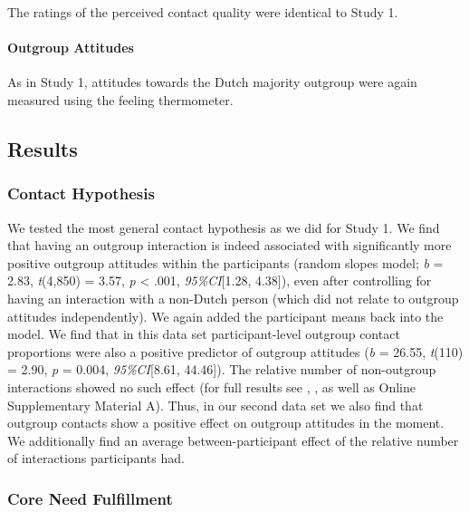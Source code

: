 The ratings of the perceived contact quality were identical to Study 1.

\paragraph{Outgroup Attitudes}

As in Study 1, attitudes towards the Dutch majority outgroup were again
measured using the feeling thermometer.

\subsection{Results}

\subsubsection{Contact Hypothesis}

We tested the most general contact hypothesis as we did for Study 1. We
find that having an outgroup interaction is indeed associated with
significantly more positive outgroup attitudes within the participants
(random slopes model; \textit{b} = 2.83, \textit{t}(4,850) = 3.57,
\textit{p} \textless{} .001, \textit{95\%CI}{[}1.28, 4.38{]}), even
after controlling for having an interaction with a non-Dutch person
(which did not relate to outgroup attitudes independently). We again
added the participant means back into the model. We find that in this
data set participant-level outgroup contact proportions were also a
positive predictor of outgroup attitudes (\textit{b} = 26.55,
\textit{t}(110) = 2.90, \textit{p} = 0.004, \textit{95\%CI}{[}8.61,
44.46{]}). The relative number of non-outgroup interactions showed no
such effect (for full results see ,
, as well as Online Supplementary Material
A). Thus, in our second data set we also find that outgroup contacts
show a positive effect on outgroup attitudes in the moment. We
additionally find an average between-participant effect of the relative
number of interactions participants had.

\subsubsection{Core Need Fulfillment}

